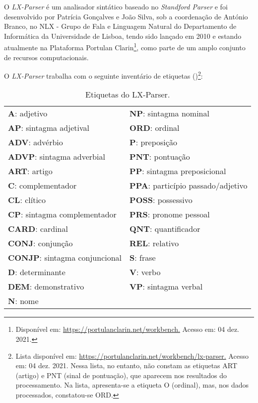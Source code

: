 \documentclass[portuguese]{textolivre}
\begin{document}
O \textit{LX-Parser} é um analisador sintático baseado no \textit{Standford Parser} e foi desenvolvido por Patrícia Gonçalves e João Silva, sob a coordenação de António Branco, no NLX - Grupo de Fala e Linguagem Natural do Departamento de Informática da Universidade de Lisboa, tendo sido lançado em 2010 \cite{silva_out-box_2010} e estando atualmente na Plataforma Portulan Clarin\footnote{Disponível em: \url{https://portulanclarin.net/workbench.} Acesso em: 04 dez. 2021.}, como parte de um amplo conjunto de recursos computacionais.

O \textit{LX-Parser} trabalha com o seguinte inventário de etiquetas ()\footnote{Lista disponível em: \url{https://portulanclarin.net/workbench/lx-parser.} Acesso em: 04 dez. 2021. Nessa lista, no entanto, não constam as etiquetas ART (artigo) e PNT (sinal de pontuação), que aparecem nos resultados do processamento. Na lista, apresenta-se a etiqueta O (ordinal), mas, nos dados processados, constatou-se ORD.}: 

\begin{table}[htbp]
\centering
\begin{threeparttable}
\caption{Etiquetas do LX-Parser.}
\begin{tabular} {ll}
\toprule
\textbf{A}: adjetivo & \textbf{NP}: sintagma nominal \protect \footnotemark \\
\textbf{AP}: sintagma adjetival & \textbf{ORD}: ordinal \\
\textbf{ADV}: advérbio & \textbf{P}: preposição \\
\textbf{ADVP}: sintagma adverbial &	\textbf{PNT}: pontuação \\
\textbf{ART}: artigo & \textbf{PP}: sintagma preposicional \\
\textbf{C}: complementador & \textbf{PPA}: particípio passado/adjetivo \\
\textbf{CL}: clítico & \textbf{POSS}: possessivo \\
\textbf{CP}: sintagma complementador & \textbf{PRS}: pronome pessoal \\
\textbf{CARD}: cardinal & \textbf{QNT}: quantificador \\
\textbf{CONJ}: conjunção & \textbf{REL}: relativo \\
\textbf{CONJP}: sintagma conjuncional & \textbf{S}: frase \\
\textbf{D}: determinante & \textbf{V}: verbo \\
\textbf{DEM}: demonstrativo & \textbf{VP}: sintagma verbal \\
\textbf{N}: nome  \\
\bottomrule
\end{tabular}
\label{Tabela01}
\end{threeparttable}
\end{table}
\end{document}
